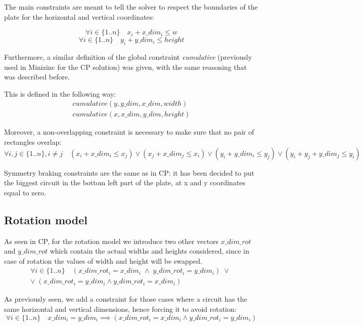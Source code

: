 The main constraints are meant to tell the solver to respect the boundaries of the plate for the horizontal and vertical coordinates:

\begin{equation*}
     \forall i \in \{1..n\} \quad x_i + x\_dim_i \leq w
\end{equation*}
\begin{equation*}
     \forall i \in \{1..n\} \quad y_i + y\_dim_i \leq height
\end{equation*}

Furthermore, a similar definition of the global constraint \textit{cumulative} (previously used in Minizinc for the CP solution) was given, with the same reasoning that was described before.

This is defined in the following way:
\begin{gather*}
cumulative(y, y\_dim, x\_dim, width) \\
cumulative(x, x\_dim, y\_dim, height)
\end{gather*}

Moreover, a non-overlapping constraint is necessary to make sure that no pair of rectangles overlap:
\begin{equation*}
     \forall i,j \in \{1..n\}, i \neq j \quad (x_i + x\_dim_i \leq x_j) \lor (x_j + x\_dim_j \leq x_i) \lor (y_i + y\_dim_i \leq y_j) \lor (y_i + y_j + y\_dim_j \leq y_i)
\end{equation*}

Symmetry braking constraints are the same as in CP: it has been decided to put the biggest circuit in the bottom left part of the plate, at x and y coordinates equal to zero.

\subsection{Rotation model}

As seen in CP, for the rotation model we introduce two other vectors $x\_dim\_rot$ and $y\_dim\_rot$ which contain the actual widths and heights considered, since in case of rotation the values of width and height will be swapped. 
\begin{gather*}
     \forall i \in \{1..n\} \quad (x\_dim\_rot_i = x\_dim_i \; \land \; y\_dim\_rot_i = y\_dim_i) \; \lor \; \\
     \lor \; (x\_dim\_rot_i = y\_dim_i \land y\_dim\_rot_i = x\_dim_i)
\end{gather*}

As previously seen, we add a constraint for those cases where a circuit has the same horizontal and vertical dimensions, hence forcing it to avoid rotation:
\begin{equation*}
     \forall i \in \{1..n\} \quad x\_dim_i = y\_dim_i \implies (x\_dim\_rot_i = x\_dim_i \land y\_dim\_rot_i = y\_dim_i)
\end{equation*}

